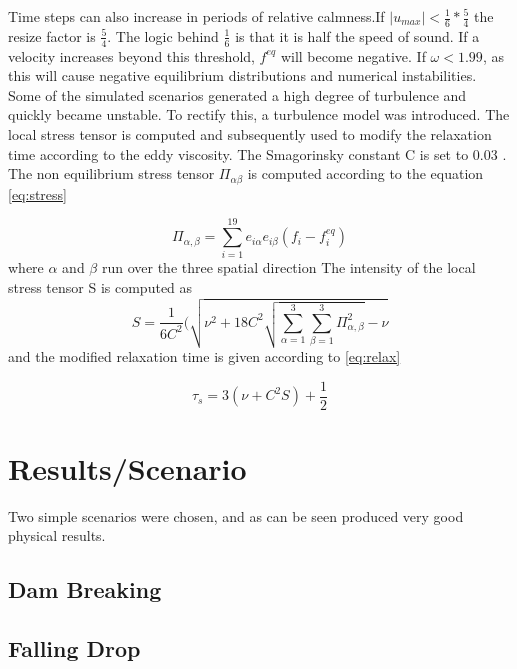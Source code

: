 \documentclass[10pt,a4paper,notitlepage]{article}
\begin{document}
Time steps can also increase in periods of relative calmness.If $|u_{max}|<\frac{1}{6}*\frac{5}{4}$ the resize factor is $\frac{5}{4}$. The logic behind $\frac{1}{6}$ is that it is half the speed of sound. If a velocity increases beyond this threshold, $f^{eq}$ will become negative.
If $\omega<1.99$, as this will cause negative equilibrium distributions and numerical instabilities. Some of the simulated scenarios generated a high degree of turbulence and quickly became unstable. To rectify this, a turbulence model was introduced. The local stress tensor is computed and subsequently used to modify the relaxation time according to the eddy viscosity. The Smagorinsky constant C is set to 0.03 \cite{thurey2007physically}. The non equilibrium stress tensor $\Pi_{\alpha\beta}$ is computed according to the equation \eqref{eq:stress}

\begin{equation} \label{eq:stress}
\Pi_{\alpha,\beta}=\sum^{19}_{i=1}e_{i\alpha}e_{i\beta}(f_{i}-f_{i}^{eq})
\end{equation}
where $\alpha$ and $\beta$ run over the three spatial direction
 The intensity of the local stress tensor S is computed as 
\begin{equation} \label{eq:intensity}
S=\frac{1}{6C^{2}}(\sqrt{\nu^{2}+18C^{2}\sqrt{\sum^{3}_{\alpha=1}\sum^{3}_{\beta=1}\Pi_{\alpha,\beta}^{2}}-\nu}
\end{equation}
and the modified relaxation time is given according to \eqref{eq:relax}

\begin{equation} \label{eq:relax}
\tau_s=3(\nu+C^{2}S)+\frac{1}{2}
\end{equation}
\section{Results/Scenario}
Two simple scenarios were chosen, and as can be seen produced very good physical results.
\subsection{Dam Breaking}
\subsection{Falling Drop}


\end{document}
